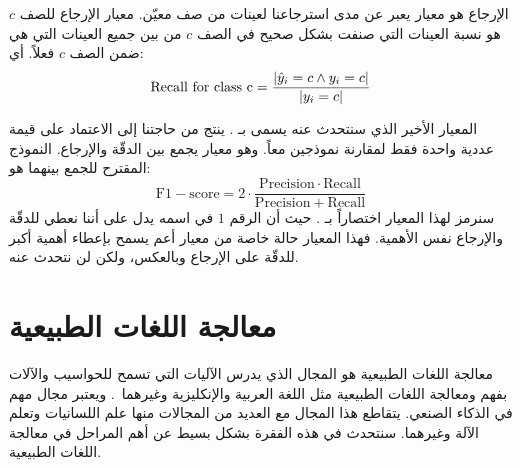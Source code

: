 الإرجاع  هو معيار يعبر عن مدى استرجاعنا لعينات من صف معيّن.
معيار الإرجاع للصف $c$ هو نسبة العينات التي صنفت بشكل صحيح في الصف $c$ من بين جميع العينات التي هي ضمن الصف $c$ فعلاً.
أي:
$$ \mathrm{Recall\ for\ class\ c} =
\frac{ \left\vert \hat{y}_i = c \wedge y_i = c \right\vert }{ \left\vert y_i = c \right\vert } $$

المعيار الأخير الذي سنتحدث عنه يسمى بـ .
ينتج من حاجتنا إلى الاعتماد على قيمة عددية واحدة فقط لمقارنة نموذجين معاً.
وهو معيار يجمع بين الدقّة والإرجاع.
النموذج المقترح للجمع بينهما هو:
$$ \mathrm{F1-score} = 2 \cdot \frac{ \mathrm{Precision} \cdot \mathrm{Recall}}
{\mathrm{Precision} + \mathrm{Recall}} $$
سنرمز لهذا المعيار اختصاراً بـ .
حيث أن الرقم $1$ في اسمه يدل على أننا نعطي للدقّة والإرجاع نفس الأهمية.
فهذا المعيار حالة خاصة من معيار أعم يسمح بإعطاء أهمية أكبر للدقّة على الإرجاع وبالعكس، ولكن لن نتحدث عنه.



\section{معالجة اللغات الطبيعية}
معالجة اللغات الطبيعية
هو المجال الذي يدرس الآليات التي تسمح للحواسيب والآلات بفهم ومعالجة اللغات الطبيعية مثل اللغة العربية والإنكليزية وغيرهما~\cite{riad2017}.
ويعتبر مجال مهم في الذكاء الصنعي.
يتقاطع هذا المجال مع العديد من المجالات منها علم اللسانيات وتعلم الآلة وغيرهما.
سنتحدث في هذه الفقرة بشكل بسيط عن أهم المراحل في معالجة اللغات الطبيعية.

